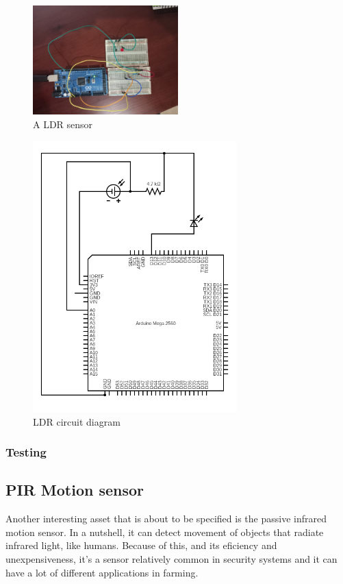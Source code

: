 \begin{figure}[H]
    \centering
    \includegraphics[width=0.5\textwidth]{fig/ldr-circuit.jpg}
    \caption{A LDR sensor}
    \label{fig:ldr}
\end{figure}




\begin{figure}[H]
    \centering
    \includegraphics[width=0.7\textwidth]{fig/ldr-scheme-circuit.png}
    \caption{LDR circuit diagram}
    \label{fig:ldr}
\end{figure}


\subsubsection{Testing}

\subsection{PIR Motion sensor}
Another interesting asset that is about to be specified is the passive infrared motion sensor\cite{pir-guide}. In a nutshell, it can detect movement of objects that radiate infrared light, like humans. Because of this, and its eficiency and unexpensiveness, it's a sensor relatively common in security systems and it can have a lot of different applications in farming.


